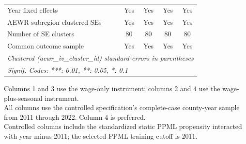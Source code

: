 \begin{table}[htbp]
\begin{tabular}{lcccc}
      Year fixed effects                   & Yes       & Yes          & Yes                  & Yes\\  
      AEWR-subregion clustered SEs         & Yes       & Yes          & Yes                  & Yes\\  
      Number of SE clusters                & 80        & 80           & 80                   & 80\\  
      Common outcome sample                & Yes       & Yes          & Yes                  & Yes\\  
      \midrule \midrule
      \multicolumn{5}{l}{\emph{Clustered (aewr\_iv\_cluster\_id) standard-errors in parentheses}}\\
      \multicolumn{5}{l}{\emph{Signif. Codes: ***: 0.01, **: 0.05, *: 0.1}}\\
   \end{tabular}
   
   \par \raggedright 
   Columns 1 and 3 use the wage-only instrument; columns 2 and 4 use the wage-plus-seasonal instrument.\\
   All columns use the controlled specification's complete-case county-year sample from 2011 through 2022. Column 4 is preferred.\\
   Controlled columns include the standardized static PPML propensity interacted with year minus 2011; the selected PPML training cutoff is 2011.
\end{table}


